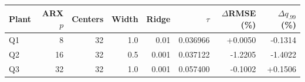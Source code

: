 \begin{tabular}{lrrrrrrr}\toprule
Plant & ARX $p$ & Centers & Width & Ridge & $\tau$ & $\Delta$RMSE (\%) & $\Delta q_{.99}$ (\%) \\\midrule
Q1 & 8 & 32 & 1.0 & 0.01 & 0.036966 & +0.0050 & -0.1314 \\
Q2 & 16 & 32 & 0.5 & 0.001 & 0.037122 & -1.2205 & -1.4022 \\
Q3 & 32 & 32 & 1.0 & 0.001 & 0.057400 & -0.1002 & +0.1506 \\
\bottomrule\end{tabular}
